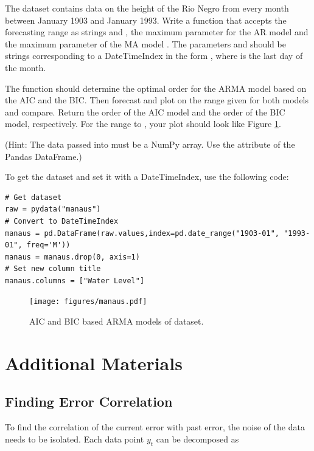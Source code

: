 \begin{problem}
The dataset  contains data on the height of the Rio Negro from every month between January 1903 and January 1993.
Write a function  that accepts the forecasting range as strings  and , the maximum parameter for the AR model  and the maximum parameter of the MA model .
The parameters  and  should be strings corresponding to a DateTimeIndex in the form , where  is the last day of the month.

The function should determine the optimal order for the ARMA model based on the AIC and the BIC.
Then forecast and plot on the range given for both models and compare.
Return the order of the AIC model and the order of the BIC model, respectively.
For the range  to , your plot should look like Figure \ref{fig:manaus}.

(Hint: The data passed into  must be a NumPy array. Use the attribute  of the Pandas DataFrame.)

To get the  dataset and set it with a DateTimeIndex, use the following code:
\begin{lstlisting}
# Get dataset
raw = pydata("manaus")
# Convert to DateTimeIndex
manaus = pd.DataFrame(raw.values,index=pd.date_range("1903-01", "1993-01", freq='M'))
manaus = manaus.drop(0, axis=1)
# Set new column title
manaus.columns = ["Water Level"]
\end{lstlisting}
\label{prob:manaus}
\end{problem}

\begin{figure}[H]
\centering
\texttt{[image: figures/manaus.pdf]}
\caption{AIC and BIC based ARMA models of  dataset.}
\label{fig:manaus}
\end{figure}


\pagebreak

\section*{Additional Materials}

\subsection*{Finding Error Correlation}
To find the correlation of the current error with past error, the noise of the data needs to be isolated.
Each data point $y_t$ can be decomposed as

